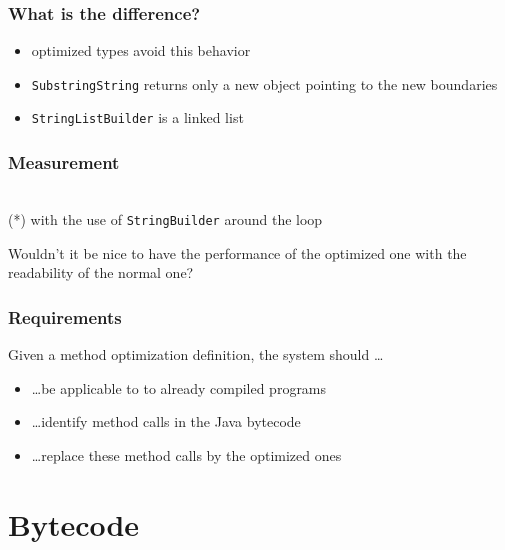 \documentclass{beamer}
\begin{document}
\begin{frame}
  \frametitle{What is the difference?}
	\begin{itemize}
	  \item optimized types avoid this behavior 
	  \item \texttt{SubstringString} returns only a new object pointing to the new boundaries
	  \item \texttt{StringListBuilder} is a linked list
	\end{itemize} 
\end{frame}

\begin{frame}
  \frametitle{Measurement}

  \begin{bchart}[step=1000,max=3000]
      \smallskip
      \smallskip
  \end{bchart}
  \\
  \vspace{1cm}
  \footnotesize (*) with the use of \texttt{StringBuilder} around the loop
\end{frame}

\begin{frame}
  \begin{center}
  \huge Wouldn't it be nice to have the performance of the optimized one with the readability of the normal one?
  \end{center}

\end{frame}

\begin{frame}
  \frametitle{Requirements}  
  Given a method optimization definition, the system should \dots
  
  \begin{itemize}
    \item \dots be applicable to to already compiled programs
    \item \dots identify method calls in the Java bytecode
    \item \dots replace these method calls by the optimized ones
  \end{itemize}
\end{frame}

\section{Bytecode}
\end{document}
